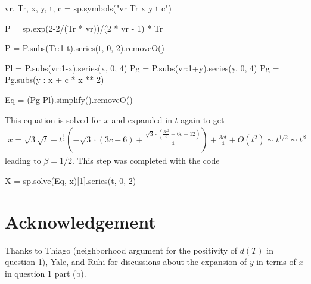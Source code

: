 \documentclass[10pt, a4paper]{article}
\begin{document}
{\begin{enumerate}
\begin{python}
vr, Tr, x, y, t, c = sp.symbols("vr Tr x y t c")

P = sp.exp(2-2/(Tr * vr))/(2 * vr - 1) * Tr

P = P.subs({Tr:1-t}).series(t, 0, 2).removeO()

Pl = P.subs({vr:1-x}).series(x, 0, 4) 
Pg = P.subs({vr:1+y}).series(y, 0, 4) 
Pg = Pg.subs({y : x + c * x ** 2})

Eq = (Pg-Pl).simplify().removeO()
\end{python}
This equation is solved for $x$ and expanded in $t$ again to get 
\begin{align*}
  x = \sqrt{3} \sqrt{t} + t^{\frac{3}{2}} \left(- \sqrt{3} \cdot \left(3 c - 6\right) + \frac{\sqrt{3} \cdot \left(\frac{3 c^{2}}{8} + 6 c - 12\right)}{4}\right) + \frac{3 c t}{4} + O\left(t^{2}\right) \sim t^{1/2} \sim t^{\beta}
\end{align*}
leading to $\beta = 1/2$. This step was completed with the code 
\begin{python}
  X = sp.solve(Eq, x)[1].series(t, 0, 2)
\end{python}
\end{enumerate}






\section{Acknowledgement}
Thanks to Thiago (neighborhood argument for the positivity of $d(T)$ in question 1), Yale, and Ruhi for discussions about the expansion of $y$ in terms of $x$ in question $1$ part (b). 
}

\makereferences


\end{document}
